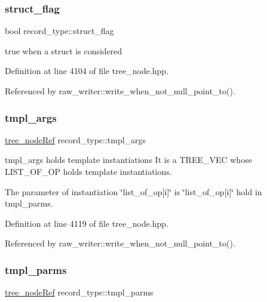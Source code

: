 \subsubsection{\texorpdfstring{struct\+\_\+flag}{struct\_flag}}
{\footnotesize\ttfamily bool record\+\_\+type\+::struct\+\_\+flag}



true when a struct is considered 



Definition at line 4104 of file tree\+\_\+node.\+hpp.



Referenced by raw\+\_\+writer\+::write\+\_\+when\+\_\+not\+\_\+null\+\_\+point\+\_\+to().

\mbox{\label{structrecord__type_a51e97437eacc6da88f6cae72a2423d69}} 
\subsubsection{\texorpdfstring{tmpl\+\_\+args}{tmpl\_args}}
{\footnotesize\ttfamily \hyperlink{tree__node_8hpp_a6ee377554d1c4871ad66a337eaa67fd5}{tree\+\_\+node\+Ref} record\+\_\+type\+::tmpl\+\_\+args}



tmpl\+\_\+args holds template instantiations It is a T\+R\+E\+E\+\_\+\+V\+EC whose L\+I\+S\+T\+\_\+\+O\+F\+\_\+\+OP holds template instantiations. 

The parameter of instantiation \char`\"{}list\+\_\+of\+\_\+op\mbox{[}i\mbox{]}\char`\"{} is \char`\"{}list\+\_\+of\+\_\+op\mbox{[}i\mbox{]}\char`\"{} hold in tmpl\+\_\+parms. 

Definition at line 4119 of file tree\+\_\+node.\+hpp.



Referenced by raw\+\_\+writer\+::write\+\_\+when\+\_\+not\+\_\+null\+\_\+point\+\_\+to().

\mbox{\label{structrecord__type_abfade04fea376341e3ed1811059f6822}} 
\subsubsection{\texorpdfstring{tmpl\+\_\+parms}{tmpl\_parms}}
{\footnotesize\ttfamily \hyperlink{tree__node_8hpp_a6ee377554d1c4871ad66a337eaa67fd5}{tree\+\_\+node\+Ref} record\+\_\+type\+::tmpl\+\_\+parms}



